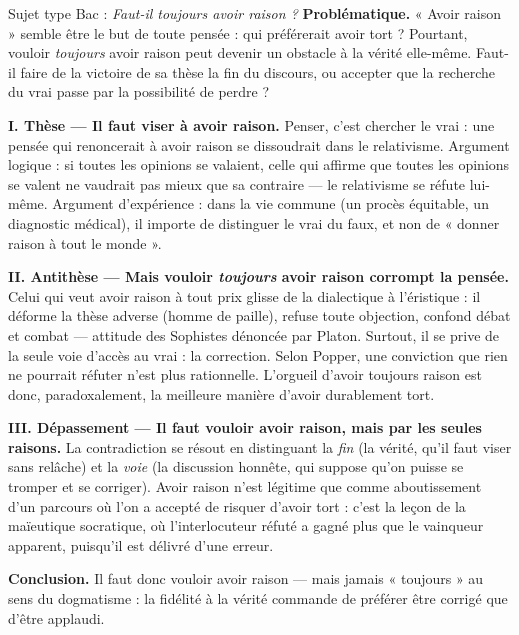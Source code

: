 \documentclass[11pt]{article}
\begin{document}
\begin{exoresolu}
Sujet type Bac : \emph{Faut-il toujours avoir raison ?}
\tcblower
\textbf{Problématique.} « Avoir raison » semble être le but de toute pensée : qui préférerait avoir tort ? Pourtant, vouloir \emph{toujours} avoir raison peut devenir un obstacle à la vérité elle-même. Faut-il faire de la victoire de sa thèse la fin du discours, ou accepter que la recherche du vrai passe par la possibilité de perdre ?

\textbf{I. Thèse — Il faut viser à avoir raison.} Penser, c'est chercher le vrai : une pensée qui renoncerait à avoir raison se dissoudrait dans le relativisme. Argument logique : si toutes les opinions se valaient, celle qui affirme que toutes les opinions se valent ne vaudrait pas mieux que sa contraire — le relativisme se réfute lui-même. Argument d'expérience : dans la vie commune (un procès équitable, un diagnostic médical), il importe de distinguer le vrai du faux, et non de « donner raison à tout le monde ».

\textbf{II. Antithèse — Mais vouloir \emph{toujours} avoir raison corrompt la pensée.} Celui qui veut avoir raison à tout prix glisse de la dialectique à l'éristique : il déforme la thèse adverse (homme de paille), refuse toute objection, confond débat et combat — attitude des Sophistes dénoncée par Platon. Surtout, il se prive de la seule voie d'accès au vrai : la correction. Selon Popper, une conviction que rien ne pourrait réfuter n'est plus rationnelle. L'orgueil d'avoir toujours raison est donc, paradoxalement, la meilleure manière d'avoir durablement tort.

\textbf{III. Dépassement — Il faut vouloir avoir raison, mais par les seules raisons.} La contradiction se résout en distinguant la \emph{fin} (la vérité, qu'il faut viser sans relâche) et la \emph{voie} (la discussion honnête, qui suppose qu'on puisse se tromper et se corriger). Avoir raison n'est légitime que comme aboutissement d'un parcours où l'on a accepté de risquer d'avoir tort : c'est la leçon de la maïeutique socratique, où l'interlocuteur réfuté a gagné plus que le vainqueur apparent, puisqu'il est délivré d'une erreur.

\textbf{Conclusion.} Il faut donc vouloir avoir raison — mais jamais « toujours » au sens du dogmatisme : la fidélité à la vérité commande de préférer être corrigé que d'être applaudi.
\end{exoresolu}
\end{document}
